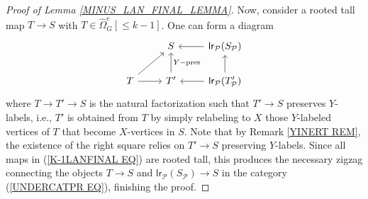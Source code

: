 \documentclass[a4paper,10pt]{article}%
\begin{document}
\begin{proof}[Proof of Lemma \ref{MINUS_LAN_FINAL_LEMMA}]
 
Now, consider a rooted tall map $T \to S$ with 
$T \in \widehat{\Omega}_G^e[\leq\! k-1]$. One can form a diagram
\begin{equation}\label{K-1LANFINAL EQ}
\begin{tikzcd}
      & S & \mathsf{lr}_{\mathcal{P}}(S_{\mathcal{P}}) \ar{l}
      \\
      T \ar{ur} \ar{r} & T' \ar{u}[swap]{Y-\text{pres}} & \mathsf{lr}_{\mathcal{P}}(T'_{\mathcal{P}}) \ar{l} \ar{u}
\end{tikzcd}
\end{equation}
where $T \to T' \to S$ is the natural factorization such that $ T' \to S$ preserves $Y$-labels, 
i.e., $T'$ is obtained from $T$ by simply relabeling to $X$ those $Y$-labeled vertices of $T$ that become $X$-vertices in $S$.
Note that by Remark \ref{YINERT REM}, the existence
of the right square relies on 
$T' \to S$ preserving $Y$-labels.
Since all maps in 
(\ref{K-1LANFINAL EQ})
are rooted tall, 
this produces the
necessary zigzag connecting the objects $T \to S$ and 
$\mathsf{lr}_{\mathcal{P}}(S_{\mathcal{P}}) \to S$
in the category (\ref{UNDERCATPR EQ}), finishing the proof.
%
%

\end{proof}
\end{document}
